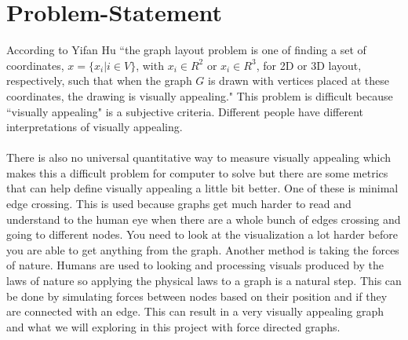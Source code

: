 \newpage
\section{Problem-Statement}
According to Yifan Hu ``the graph layout problem is one of finding a set of coordinates, $x = \{x_i | i \in V\}$,
with $x_i \in R^2$ or $x_i \in R^3$, for 2D or 3D layout, respectively, such that when the
graph $G$ is drawn with vertices placed at these coordinates, the drawing is visually
appealing." \cite{hu2005efficient} This problem is difficult because ``visually appealing" is a subjective criteria. Different people have different interpretations of visually appealing. \\\\There is also no universal quantitative way to measure visually appealing which makes this a difficult problem for computer to solve but there are some metrics that can help define visually appealing a little bit better. One of these is minimal edge crossing. This is used because graphs get much harder to read and understand to the human eye when there are a whole bunch of edges crossing and going to different nodes. You need to look at the visualization a lot harder before you are able to get anything from the graph. Another method is taking the forces of nature. Humans are used to looking and processing visuals produced by the laws of nature so applying the physical laws to a graph is a natural step. This can be done by simulating forces between nodes based on their position and if they are connected with an edge. This can result in a very visually appealing graph and what we will exploring in this project with force directed graphs. 